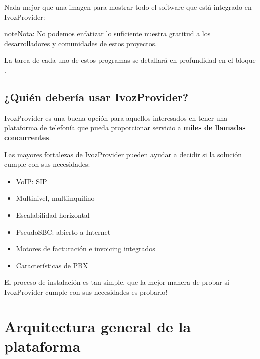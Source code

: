 \documentclass[letterpaper,10pt,spanish]{sphinxmanual}
\begin{document}
Nada mejor que una imagen para mostrar todo el software que está integrado en IvozProvider:


\begin{notice}{note}{Nota:}
No podemos enfatizar lo suficiente nuestra gratitud a los desarrolladores y comunidades de estos proyectos.
\end{notice}

La tarea de cada uno de estos programas se detallará en profundidad en el bloque {\hyperref[basic_concepts/architecture/index:architecture]{}}.


\section{¿Quién debería usar IvozProvider?}
\label{basic_concepts/intro/use_cases::doc}\label{basic_concepts/intro/use_cases:who-should-use-ivozprovider}
IvozProvider es una buena opción para aquellos interesados en tener una plataforma de telefonía que pueda proporcionar servicio a \textbf{miles de llamadas concurrentes}.

Las mayores fortalezas de IvozProvider pueden ayudar a decidir si la solución cumple con sus necesidades:
\begin{itemize}
\item {} 
VoIP: SIP

\item {} 
Multinivel, multiinquilino

\item {} 
Escalabilidad horizontal

\item {} 
PseudoSBC: abierto a Internet

\item {} 
Motores de facturación e invoicing integrados

\item {} 
Características de PBX

\end{itemize}

El proceso de instalación es tan simple, que la mejor manera de probar si IvozProvider cumple con sus necesidades es probarlo!


\chapter{Arquitectura general de la plataforma}
\label{basic_concepts/architecture/index:platform-general-architecture}\label{basic_concepts/architecture/index::doc}\label{basic_concepts/architecture/index:architecture}
\end{document}
